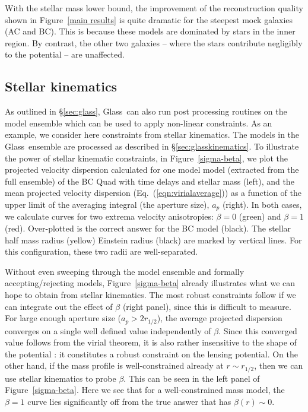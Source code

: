 \documentclass[galley,usenatbib]{mn2e}
\newcommand{\Glass}{{\sc Glass}}
\newcommand{\figref}[1] {Figure~\ref{#1}}
\newcommand{\eqnref}[1] {Eq.~(\ref{#1})}
\begin{document}
With the stellar mass lower bound, the improvement of the reconstruction
quality shown in \figref{main results} is quite dramatic for the
steepest mock galaxies (AC and BC). This is because these models are dominated
by stars in the inner region. By contrast, the other two galaxies -- where the stars contribute negligibly to the potential -- are unaffected.

\subsection{Stellar kinematics}\label{sec:results_stellar_kinematics}

As outlined in \S\ref{sec:glass}, \Glass\ can also run post processing routines
on the model ensemble which can be used to apply non-linear constraints. As an
example, we consider here constraints from stellar kinematics. The models in
the \Glass\ ensemble are processed as described in \S\ref{sec:glasskinematics}.
To illustrate the power of stellar kinematic constraints, in
\figref{sigma-beta}, we plot the projected velocity dispersion calculated for
one model model (extracted from the full ensemble) of the BC Quad with time
delays and stellar mass (left), and the mean projected velocity dispersion
(\eqnref{eqn:virialaverage}) as a function of the upper limit of the averaging
integral (the aperture size), $a_p$ (right). In both cases, we calculate curves
for two extrema velocity anisotropies: $\beta=0$ (green) and $\beta=1$ (red).
Over-plotted is the correct answer for the BC model (black). The stellar half
mass radius (yellow) Einstein radius (black) are marked by vertical lines. For
this configuration, these two radii are well-separated.

Without even sweeping through the model ensemble and formally
accepting/rejecting models, \figref{sigma-beta} already illustrates what we can
hope to obtain from stellar kinematics. The most robust constraints follow if
we can integrate out the effect of $\beta$ (right panel), since this is
difficult to measure. For large enough aperture size ($a_p > 2r_{1/2}$), the
average projected dispersion converges on a single well defined value
independently of $\beta$. Since this converged value follows from the virial
theorem, it is also rather insensitive to the shape of the potential
\citep{2012ApJ...754L..39A}: it constitutes a robust constraint on the lensing
potential. On the other hand, if the mass profile is well-constrained already
at $r \sim r_{1/2}$, then we can use stellar kinematics to probe $\beta$. This
can be seen in the left panel of \figref{sigma-beta}. Here we see that for a
well-constrained mass model, the $\beta = 1$ curve lies significantly off from
the true answer that has $\beta(r) \sim 0$. 
\end{document}
